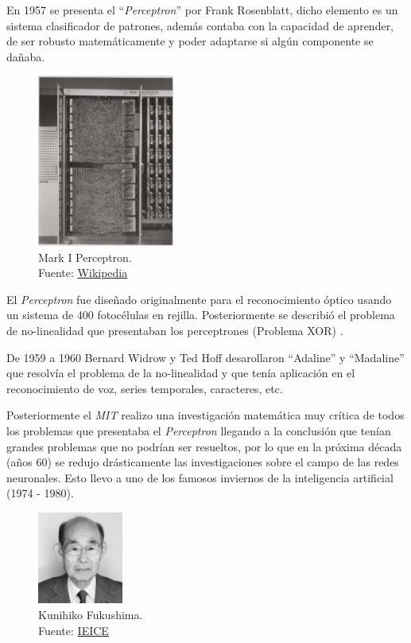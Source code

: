 En 1957 se presenta el ``\textit{Perceptron}'' por {Frank Rosenblatt}, dicho elemento es un sistema clasificador de patrones, además contaba con la capacidad de aprender, de ser robusto matemáticamente y poder adaptarse si algún componente se dañaba.

\begin{figure}[H]
    \centering
    \includegraphics[width=0.4\textwidth]{figures/perceptron.png}
    \caption{Mark I Perceptron.\\Fuente: \href{https://en.wikipedia.org/wiki/Perceptron}{Wikipedia}}
    \label{fig:perceptron}
\end{figure}

El \textit{Perceptron} fue diseñado originalmente para el reconocimiento óptico usando un sistema de 400 fotocélulas en rejilla.
Posteriormente se describió el problema de no-linealidad que presentaban los perceptrones (Problema XOR) \cite{cuevastello2018apuntes}.

De 1959 a 1960 {Bernard Widrow} y {Ted Hoff} desarollaron ``Adaline'' y ``Madaline'' \cite{widrow1960adaptive} que resolvía el problema de la no-linealidad y que tenía aplicación en el reconocimiento de voz, series temporales, caracteres, etc.

Posteriormente el \textit{MIT} realizo una investigación matemática muy crítica de todos los problemas que presentaba el \textit{Perceptron} llegando a la conclusión que tenían grandes problemas que no podrían ser resueltos, por lo que en la próxima década (años 60) se redujo drásticamente las investigaciones sobre el campo de las redes neuronales.
Esto llevo a uno de los famosos inviernos de la inteligencia artificial (1974 - 1980).

\begin{figure}[H]
    \centering
    \includegraphics[width=0.25\textwidth]{figures/Kunihiko Fukushima.jpg}
    \caption{Kunihiko Fukushima.\\Fuente: \href{https://www.ieice.org/eng/about_ieice/new_honorary_members_award_winners/2017/meiyo_05e.html}{IEICE}}
    \label{fig:kunihiko-fukushima}
\end{figure}

